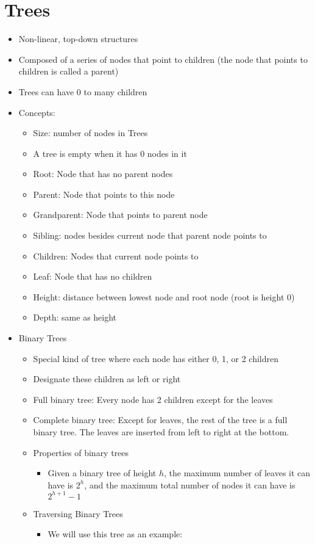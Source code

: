 \documentclass{article}
\begin{document}
\section{Trees}
\begin{itemize}
    \item Non-linear, top-down structures
    \item Composed of a series of nodes that point to children (the node that points to children is called a parent)
    \item Trees can have 0 to many children
    \item Concepts:
        \begin{itemize}
            \item Size: number of nodes in Trees
            \item A tree is empty when it has 0 nodes in it
            \item Root: Node that has no parent nodes
            \item Parent: Node that points to this node
            \item Grandparent: Node that points to parent node
            \item Sibling: nodes besides current node that parent node points to
            \item Children: Nodes that current node points to
            \item Leaf: Node that has no children
            \item Height: distance between lowest node and root node (root is height 0)
            \item Depth: same as height
        \end{itemize}
    \item Binary Trees
        \begin{itemize}
            \item Special kind of tree where each node has either 0, 1, or 2 children
            \item Designate these children as left or right
            \item Full binary tree: Every node has 2 children except for the leaves
            \item Complete binary tree: Except for leaves, the rest of the tree is a full binary tree. The leaves are inserted from left to right at the bottom.
            \item Properties of binary trees
                \begin{itemize}
                    \item Given a binary tree of height $h$, the maximum number of leaves it can have is $2^h$, and the maximum total number of nodes it can have is $2^{h + 1} - 1$
                \end{itemize}
            \item Traversing Binary Trees
                \begin{itemize}
                    \item We will use this tree as an example:


\end{itemize}
\end{itemize}
\end{itemize}
\end{document}
